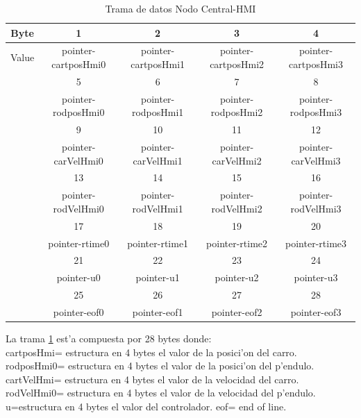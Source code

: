 \begin{table}[htbp]
\begin{center}
\begin{tabular}{c c c c c}
\hline
Byte&1&2&3&4\\
\hline
Value& pointer-cartposHmi0 & pointer-cartposHmi1 & pointer-cartposHmi2 & pointer-cartposHmi3\\
\hline
&5&6&7&8\\
\hline
& pointer-rodposHmi0 &  pointer-rodposHmi1 & pointer-rodposHmi2 & pointer-rodposHmi3\\
\hline
&9&10&11&12\\
\hline
 & pointer-carVelHmi0 & pointer-carVelHmi1 & pointer-carVelHmi2 & pointer-carVelHmi3 \\
\hline
&13&14&15&16\\
\hline
& pointer-rodVelHmi0 & pointer-rodVelHmi1 & pointer-rodVelHmi2 & pointer-rodVelHmi3\\
\hline
&17&18&19&20\\
\hline
 & pointer-rtime0 & pointer-rtime1 & pointer-rtime2 & pointer-rtime3 \\
\hline
&21&22&23&24\\
\hline
& pointer-u0 & pointer-u1 & pointer-u2 & pointer-u3\\
\hline
&25&26&27&28\\
\hline
 & pointer-eof0 & pointer-eof1 & pointer-eof2 & pointer-eof3 \\
\hline 
\end{tabular}
\caption{Trama de datos Nodo Central-HMI}
\label{tabla:ncHMI}
\end{center}
\end{table}
	
La trama \ref{tabla:ncHMI} est'a compuesta por 28 bytes donde:\\
 cartposHmi= estructura en 4 bytes el valor de la posici'on del carro.\\
					rodposHmi0= estructura en 4 bytes el valor de la posici'on del p'endulo.\\
					cartVelHmi= estructura en 4 bytes el valor de la velocidad del carro.\\
					rodVelHmi0= estructura en 4 bytes el valor de la velocidad del p'endulo.\\
					u=estructura en 4 bytes el valor del controlador.
					eof= end of line.\\
